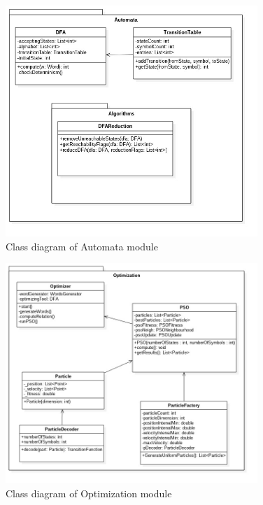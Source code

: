 \documentclass[runningheads, a4paper]{llncs}
\begin{document}
\begin{figure}[h]
\label{fig:class_automata}
\caption{Class diagram of Automata module}
    \includegraphics[width=0.85\textwidth]{res/uml/classes/automata.jpg}
\end{figure}

\begin{figure}[h]
\label{fig:class_opt_main}
\caption{Class diagram of Optimization module }
    \includegraphics[width=0.85\textwidth]{res/uml/classes/optimizationMain.jpg}
\end{figure}
\end{document}
